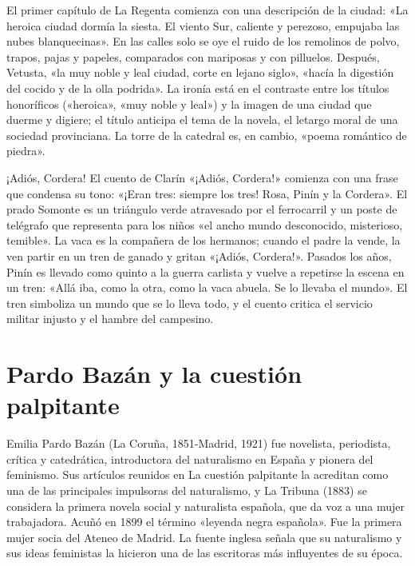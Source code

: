 \documentclass{book}
\begin{document}
El primer capítulo de La Regenta comienza con una descripción de la ciudad: «La heroica ciudad dormía la siesta. El viento Sur, caliente y perezoso, empujaba las nubes blanquecinas». En las calles solo se oye el ruido de los remolinos de polvo, trapos, pajas y papeles, comparados con mariposas y con pilluelos. Después, Vetusta, «la muy noble y leal ciudad, corte en lejano siglo», «hacía la digestión del cocido y de la olla podrida». La ironía está en el contraste entre los títulos honoríficos («heroica», «muy noble y leal») y la imagen de una ciudad que duerme y digiere; el título anticipa el tema de la novela, el letargo moral de una sociedad provinciana. La torre de la catedral es, en cambio, «poema romántico de piedra».


¡Adiós, Cordera!
El cuento de Clarín «¡Adiós, Cordera!» comienza con una frase que condensa su tono: «¡Eran tres: siempre los tres! Rosa, Pinín y la Cordera». El prado Somonte es un triángulo verde atravesado por el ferrocarril y un poste de telégrafo que representa para los niños «el ancho mundo desconocido, misterioso, temible». La vaca es la compañera de los hermanos; cuando el padre la vende, la ven partir en un tren de ganado y gritan «¡Adiós, Cordera!». Pasados los años, Pinín es llevado como quinto a la guerra carlista y vuelve a repetirse la escena en un tren: «Allá iba, como la otra, como la vaca abuela. Se lo llevaba el mundo». El tren simboliza un mundo que se lo lleva todo, y el cuento critica el servicio militar injusto y el hambre del campesino.


\section{Pardo Bazán y la cuestión palpitante}

Emilia Pardo Bazán (La Coruña, 1851-Madrid, 1921) fue novelista, periodista, crítica y catedrática, introductora del naturalismo en España y pionera del feminismo. Sus artículos reunidos en La cuestión palpitante la acreditan como una de las principales impulsoras del naturalismo, y La Tribuna (1883) se considera la primera novela social y naturalista española, que da voz a una mujer trabajadora. Acuñó en 1899 el término «leyenda negra española». Fue la primera mujer socia del Ateneo de Madrid. La fuente inglesa señala que su naturalismo y sus ideas feministas la hicieron una de las escritoras más influyentes de su época.
\end{document}
